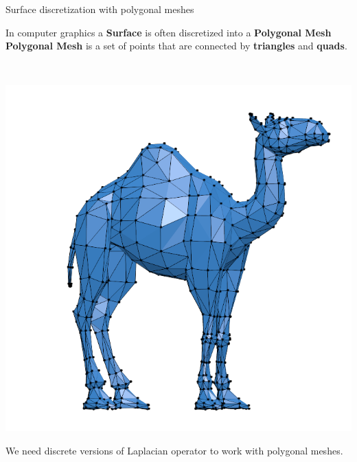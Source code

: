 \documentclass[10pt, compress, english]{beamer}
\begin{document}
\begin{frame}{Surface discretization with polygonal meshes}


\centering


\begin{minipage}[c]{0.48\columnwidth}%
In computer graphics a \textbf{Surface} is often discretized into
a \textbf{Polygonal Mesh}\\


\textbf{Polygonal Mesh} is a set of points that are connected by \textbf{triangles}
and \textbf{quads}.%
\end{minipage}~%
\begin{minipage}[c]{0.48\columnwidth}%
\includegraphics[width=1\columnwidth]{img/Polygon_mesh}%
\end{minipage}

\pause{}

\begin{alertblock}{}
We need discrete versions of Laplacian operator to work with polygonal
meshes.
\end{alertblock}




\end{frame}
\end{document}

